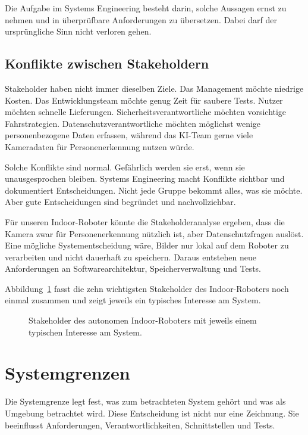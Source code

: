 Die Aufgabe im Systems Engineering besteht darin, solche Aussagen ernst zu nehmen und in überprüfbare Anforderungen zu übersetzen. Dabei darf der ursprüngliche Sinn nicht verloren gehen.

\subsection{Konflikte zwischen Stakeholdern}
Stakeholder haben nicht immer dieselben Ziele. Das Management möchte niedrige Kosten. Das Entwicklungsteam möchte genug Zeit für saubere Tests. Nutzer möchten schnelle Lieferungen. Sicherheitsverantwortliche möchten vorsichtige Fahrstrategien. Datenschutzverantwortliche möchten möglichst wenige personenbezogene Daten erfassen, während das KI-Team gerne viele Kameradaten für Personenerkennung nutzen würde.

Solche Konflikte sind normal. Gefährlich werden sie erst, wenn sie unausgesprochen bleiben. Systems Engineering macht Konflikte sichtbar und dokumentiert Entscheidungen. Nicht jede Gruppe bekommt alles, was sie möchte. Aber gute Entscheidungen sind begründet und nachvollziehbar.

\begin{praxisbox}
Für unseren Indoor-Roboter könnte die Stakeholderanalyse ergeben, dass die Kamera zwar für Personenerkennung nützlich ist, aber Datenschutzfragen auslöst. Eine mögliche Systementscheidung wäre, Bilder nur lokal auf dem Roboter zu verarbeiten und nicht dauerhaft zu speichern. Daraus entstehen neue Anforderungen an Softwarearchitektur, Speicherverwaltung und Tests.
\end{praxisbox}

Abbildung~\ref{fig:kap01-stakeholder} fasst die zehn wichtigsten Stakeholder des Indoor-Roboters noch einmal zusammen und zeigt jeweils ein typisches Interesse am System.

\begin{figure}[H]
  \centering
  \caption{Stakeholder des autonomen Indoor-Roboters mit jeweils einem typischen Interesse am System.}
  \label{fig:kap01-stakeholder}
\end{figure}

\section{Systemgrenzen}
Die Systemgrenze legt fest, was zum betrachteten System gehört und was als Umgebung betrachtet wird. Diese Entscheidung ist nicht nur eine Zeichnung. Sie beeinflusst Anforderungen, Verantwortlichkeiten, Schnittstellen und Tests.

